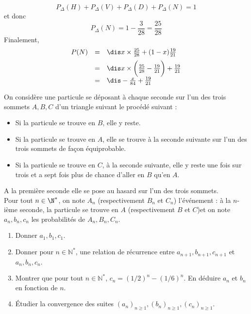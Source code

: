 \documentclass[a4paper,10pt]{report}
\begin{document}
\begin{enumerate}
\begin{enumerate}
\[ P_{\Delta}(H) + P_{\Delta}(V) + P_{\Delta}(D) + P_{\Delta}(N) = 1 \]
et donc 
\[ P_{\Delta}(N) = 1 - \frac{3}{28} = \frac{25}{28} \]
Finalement,
\[ \begin{array}{ccl}
P(N) & = & \dis x \times \frac{25}{28}+ (1-x) \frac{19}{21} \\[0.2cm]
& = & \dis x \times \bigg{(} \frac{25}{28} - \frac{19}{21} \bigg{)} + \frac{19}{21} \\[0.2cm]
& = & \dis - \frac{x}{84} + \frac{19}{21} \\
\end{array}\]
\end{enumerate}
\end{enumerate}



\begin{Exercice}{} On considère une particule se déposant à chaque seconde sur l'un des trois sommets $A,B,C$ d'un triangle suivant le procédé suivant :

\vspace{0.3cm}

\begin{itemize}
 \item Si la particule se trouve en $B$, elle y reste.
 \item Si la particule se trouve en $A$, elle se trouve à la seconde suivante sur l'un des trois sommets de façon équiprobable.
 \item Si la particule se trouve en $C$, à la seconde suivante, elle y reste une fois sur trois et a sept fois plus de chance d'aller en $B$ qu'en $A$.
\end{itemize}

\vspace{0.3cm}

\noindent A la première seconde elle se pose au hasard sur l'un des trois sommets.\\
Pour tout $n\in \N^*$, on note $A_n$ (respectivement $B_n$ et $C_n$) l'événement : \og à la $n$-ième seconde, la particule se trouve en $A$ (respectivement $B$ et $C$)\fg et on note $a_n, b_n, c_n$ les probabilités de $A_n, B_n, C_n$.

\vspace{0.3cm}

\begin{enumerate}
 \item Donner $a_1, b_1, c_1$.
 \item Donner pour $n \in \mathbb{N}^*$, une relation de récurrence entre $a_{n+1}, b_{n+1}, c_{n+1}$ et $a_n, b_n, c_n$.
 \item Montrer que pour tout $n \in \mathbb{N}^*$, $c_n = (1/2)^n-(1/6)^n$. En déduire $a_n$ et $b_n$ en fonction de $n$.
 \item Étudier la convergence des suites $(a_n)_{n \geq 1}, (b_n)_{n \geq 1}, (c_n)_{n \geq 1}$.
\end{enumerate}
\end{Exercice}
\end{document}

